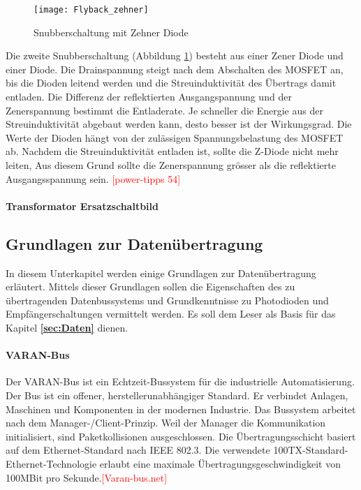 \begin{figure}[h]
	\centering
	\texttt{[image: Flyback\_zehner]}
	\caption{Snubberschaltung mit Zehner Diode}\label{fig:Flyback_zehner}
\end{figure}

Die zweite Snubberschaltung (Abbildung \ref{fig:Flyback_zehner}) besteht aus einer Zener Diode und einer Diode. Die Drainspannung steigt nach dem Abschalten des MOSFET an, bis die Dioden leitend werden und die Streuinduktivität des Übertrags damit entladen. Die Differenz der reflektierten Ausgangspannung und der Zenerspannung bestimmt die Entladerate. Je schneller die Energie aus der Streuinduktivität abgebaut werden kann, desto besser ist der Wirkungsgrad. Die Werte der Dioden hängt von der zulässigen Spannungsbelastung des MOSFET ab. Nachdem die Streuinduktivität entladen ist, sollte die Z-Diode nicht mehr leiten, Aus diesem Grund sollte die Zenerspannung grösser als die reflektierte Ausgangsspannung sein. \textcolor{red}{[power-tipps 54]}

\paragraph{Transformator Ersatzschaltbild}

\subsection{Grundlagen zur Datenübertragung}
In diesem Unterkapitel werden einige Grundlagen zur Datenübertragung erläutert. Mittels dieser Grundlagen sollen die Eigenschaften des zu übertragenden Datenbussystems und Grundkenntnisse zu Photodioden und Empfängerschaltungen vermittelt werden. Es soll dem Leser als Basis für das Kapitel \textbf{\ref{sec:Daten} } dienen.

\paragraph{VARAN-Bus}
Der VARAN-Bus ist ein Echtzeit-Bussystem für die industrielle Automatisierung. Der Bus ist ein offener, herstellerunabhängiger Standard. Er verbindet Anlagen, Maschinen und Komponenten in der modernen Industrie. Das Bussystem arbeitet nach dem Manager-/Client-Prinzip. Weil der Manager die Kommunikation initialisiert, sind Paketkollisionen ausgeschlossen. Die Übertragungsschicht basiert auf dem Ethernet-Standard nach IEEE 802.3. Die verwendete 100TX-Standard-Ethernet-Technologie erlaubt eine maximale Übertragungsgeschwindigkeit von 100MBit pro Sekunde.\textcolor{red}{[Varan-bus.net]}

